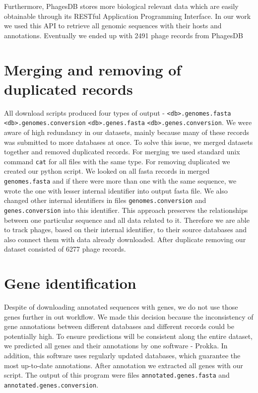Furthermore, PhagesDB stores more biological relevant data which are easily obtainable through its RESTful Application Programming Interface.
In our work we used this API to retrieve all genomic sequences with their hosts and annotations.
Eventually we ended up with 2491 phage records from PhagesDB 

\section{Merging and removing of duplicated records}
All download scripts produced four types of output - \verb|<db>.genomes.fasta| \verb|<db>.genomes.conversion| \verb|<db>.genes.fasta| \verb|<db>.genes.conversion|. 
We were aware of high redundancy in our datasets, mainly because many of these records was submitted to more databases at once.
To solve this issue, we merged datasets together and removed duplicated records.
For merging we used standard unix command \verb|cat| for all files with the same type.
For removing duplicated we created our python script.
We looked on all fasta records in merged \verb|genomes.fasta| and if there were more than one with the same sequence, we wrote the one with lesser internal identifier into output fasta file.
We also changed other internal identifiers in files \verb|genomes.conversion| and \verb|genes.conversion| into this identifier.
This approach preserves the relationships between one particular sequence and all data related to it.
Therefore we are able to track phages, based on their internal identifier, to their source databases and also connect them with data already downloaded.
After duplicate removing our dataset consisted of 6277 phage records.

\section{Gene identification}
Despite of downloading annotated sequences with genes, we do not use those genes further in out workflow.
We made this decision because the inconsistency of gene annotations between different databases and different records could be potentially high.
To ensure predictions will be consistent along the entire dataset, we predicted all genes and their annotations by one software - Prokka.
In addition, this software uses regularly updated databases, which guarantee the most up-to-date annotations.
After annotation we extracted all genes with our script.
The output of this program were files \verb|annotated.genes.fasta| and \verb|annotated.genes.conversion|.

